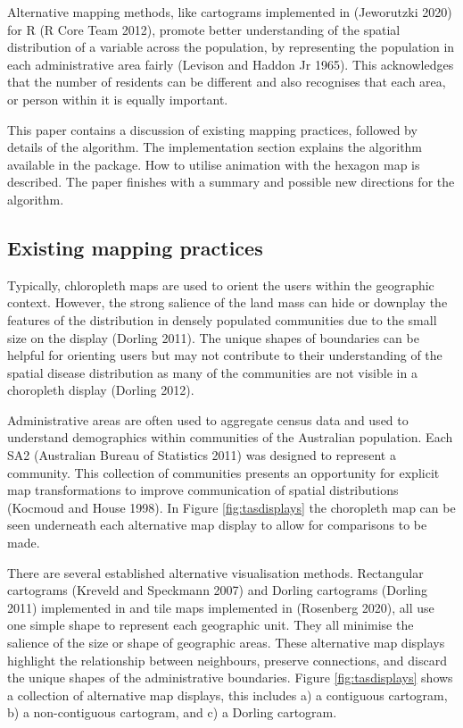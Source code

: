 Alternative mapping methods, like cartograms implemented in  (Jeworutzki 2020) for R (R Core Team 2012), promote better understanding of the spatial distribution of a variable across the population, by representing the population in each administrative area fairly (Levison and Haddon Jr 1965). This acknowledges that the number of residents can be different and also recognises that each area, or person within it is equally important.

This paper contains a discussion of existing mapping practices, followed by details of the algorithm. The implementation section explains the algorithm available in the  package. How to utilise animation with the hexagon map is described. The paper finishes with a summary and possible new directions for the algorithm.

\hypertarget{existing-mapping-practices}{%
\subsection{Existing mapping practices}\label{existing-mapping-practices}}

Typically, chloropleth maps are used to orient the users within the geographic context. However, the strong salience of the land mass can hide or downplay the features of the distribution in densely populated communities due to the small size on the display (Dorling 2011). The unique shapes of boundaries can be helpful for orienting users but may not contribute to their understanding of the spatial disease distribution as many of the communities are not visible in a choropleth display (Dorling 2012).

Administrative areas are often used to aggregate census data and used to understand demographics within communities of the Australian population. Each SA2 (Australian Bureau of Statistics 2011) was designed to represent a community. This collection of communities presents an opportunity for explicit map transformations to improve communication of spatial distributions (Kocmoud and House 1998). In Figure \ref{fig:tasdisplays} the choropleth map can be seen underneath each alternative map display to allow for comparisons to be made.

There are several established alternative visualisation methods. Rectangular cartograms (Kreveld and Speckmann 2007) and Dorling cartograms (Dorling 2011) implemented in  and tile maps implemented in  (Rosenberg 2020), all use one simple shape to represent each geographic unit. They all minimise the salience of the size or shape of geographic areas. These alternative map displays highlight the relationship between neighbours, preserve connections, and discard the unique shapes of the administrative boundaries. Figure \ref{fig:tasdisplays} shows a collection of alternative map displays, this includes a) a contiguous cartogram, b) a non-contiguous cartogram, and c) a Dorling cartogram.

